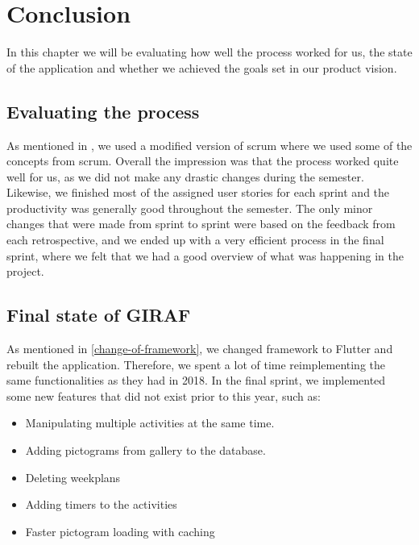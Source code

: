 \chapter{Conclusion}
In this chapter we will be evaluating how well the process worked for us, the state of the application and whether we achieved the goals set in our product vision.

\section{Evaluating the process}
As mentioned in , we used a modified version of scrum where we used some of the concepts from scrum.
Overall the impression was that the process worked quite well for us, as we did not make any drastic changes during the semester.
Likewise, we finished most of the assigned user stories for each sprint and the productivity was generally good throughout the semester.
The only minor changes that were made from sprint to sprint were based on the feedback from each retrospective, and we ended up with a very efficient process in the final sprint, where we felt that we had a good overview of what was happening in the project.

\section{Final state of GIRAF}
As mentioned in \autoref{change-of-framework}, we changed framework to Flutter and rebuilt the application.
Therefore, we spent a lot of time reimplementing the same functionalities as they had in 2018.
In the final sprint, we implemented some new features that did not exist prior to this year, such as:
\begin{itemize}
    \item Manipulating multiple activities at the same time.
    \item Adding pictograms from gallery to the database.
    \item Deleting weekplans
    \item Adding timers to the activities
    \item Faster pictogram loading with caching
\end{itemize}

